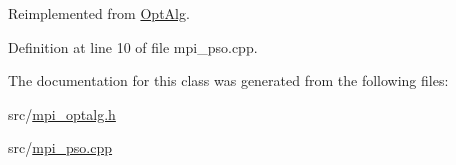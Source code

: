 Reimplemented from \hyperlink{class_opt_alg_a30d9983af0d0eb8125e888e87fd37a99}{Opt\+Alg}.



Definition at line 10 of file mpi\+\_\+pso.\+cpp.



The documentation for this class was generated from the following files\+:\begin{DoxyCompactItemize}
\item 
src/\hyperlink{mpi__optalg_8h}{mpi\+\_\+optalg.\+h}\item 
src/\hyperlink{mpi__pso_8cpp}{mpi\+\_\+pso.\+cpp}\end{DoxyCompactItemize}
